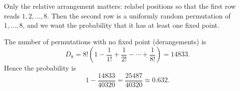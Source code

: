 Only the relative arrangement matters: relabel positions so that the first row reads $1,2,\dots,8$. Then the second row is a uniformly random permutation of $1,\dots,8$, and we want the probability that it has at least one fixed point.

The number of permutations with no fixed point (derangements) is
\[D_8=8!\left(1-\dfrac{1}{1!}+\dfrac{1}{2!}-\cdots+\dfrac{1}{8!}\right)=14833.\]
Hence the probability is
\[1-\dfrac{14833}{40320}=\boxed{\dfrac{25487}{40320}}\approx0.632.\]
